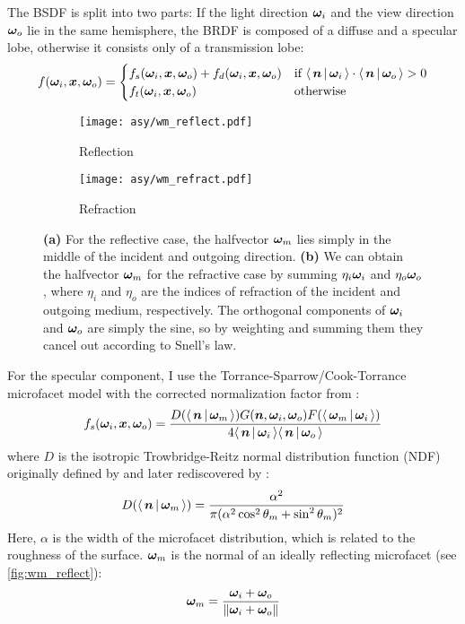 The BSDF is split into two parts: If the light direction ${\bm{\omega}_i}$ and the view direction ${\bm{\omega}_o}$ lie in the same hemisphere, the BRDF is composed of a diffuse and a specular lobe, otherwise it consists only of a transmission lobe:
\begin{equation}
    f(\wi, \vec{x}, \wo) =
    \begin{cases}
        f_s(\wi, \vec{x}, \wo) + f_d(\wi, \vec{x}, \wo) & \text{if } \NdotL \cdot \NdotV > 0 \\
        f_t(\wi, \vec{x}, \wo) & \text{otherwise}
    \end{cases}
\end{equation}

\begin{figure}
\begin{subfigure}{.5\textwidth}
    \centering
    \texttt{[image: asy/wm\_reflect.pdf]}
    \caption{Reflection}
    \label{fig:wm_reflect}
\end{subfigure}%
\begin{subfigure}{.5\textwidth}
    \centering
    \texttt{[image: asy/wm\_refract.pdf]}
    \caption{Refraction}
    \label{fig:wm_refract}
\end{subfigure}
\caption{
\textbf{(a)} For the reflective case, the halfvector $\bm{\omega}_m$ lies simply in the middle of the incident and outgoing direction.
\textbf{(b)} We can obtain the halfvector $\bm{\omega}_m$ for the refractive case by summing $\eta_i {\bm{\omega}_i}$ and $\eta_o {\bm{\omega}_o}$, where $\eta_i$ and $\eta_o$ are the indices of refraction of the incident and outgoing medium, respectively. The orthogonal components of ${\bm{\omega}_i}$ and ${\bm{\omega}_o}$ are simply the sine, so by weighting and summing them they cancel out according to Snell's law.
}
\end{figure}

For the specular component, I use the Torrance-Sparrow/Cook-Torrance microfacet model  with the corrected normalization factor from \textcite{walter2007}:
\begin{equation}
    f_s(\wi, \vec{x}, \wo) = \frac{D(\NdotH) G(\n, \wi, \wo) F(\LdotH)}{4 \NdotL \NdotV}
\end{equation}
where $D$ is the isotropic Trowbridge-Reitz normal distribution function (NDF) originally defined by \textcite{trowbridge1975} and later rediscovered by \textcite{walter2007}:
\begin{equation}
    D(\NdotH) = \frac{\alpha^2}{\pi (\alpha^2 \cos^2 \theta_m + \sin^2 \theta_m)^2}
\end{equation}
Here, $\alpha$ is the width of the microfacet distribution, which is related to the roughness of the surface.
$\bm{\omega}_m$ is the normal of an ideally reflecting microfacet (see \autoref{fig:wm_reflect}):
\begin{equation}
    \bm{\omega}_m = \frac{{\bm{\omega}_i} + {\bm{\omega}_o}}{\|{\bm{\omega}_i} + {\bm{\omega}_o}\|}
\end{equation}

